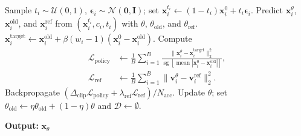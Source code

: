 \documentclass{article} %
\begin{document}
\begin{algorithm}[H]
\begin{algorithmic}[1]
                \State Sample $t_i\sim\mathcal{U}(0,1)$,
                $\boldsymbol{\epsilon}_i\sim\mathcal{N}(\mathbf{0},\mathbf{I})$;
                set $\mathbf{x}_i^{t_i}\leftarrow
                (1-t_i)\mathbf{x}_i^0+t_i\boldsymbol{\epsilon}_i$.
                \State Predict $\mathbf{x}_i^\theta$,
                $\mathbf{x}_i^{\mathrm{old}}$, and $\mathbf{x}_i^{\mathrm{ref}}$
                from $(\mathbf{x}_i^{t_i},c_i,t_i)$ with
                $\theta$, $\theta_{\mathrm{old}}$, and $\theta_{\mathrm{ref}}$.
                \State $\mathbf{x}_i^{\mathrm{target}}\leftarrow
                \mathbf{x}_i^{\mathrm{old}}+
                \beta(w_i-1)(\mathbf{x}_i^0-\mathbf{x}_i^{\mathrm{old}})$.
                \State Compute
                \[
                    \begin{aligned}
                    \mathcal{L}_{\mathrm{policy}}
                    &\leftarrow\frac{1}{B}\sum_{i=1}^{B}
                    \frac{\|\mathbf{x}_i^\theta-\mathbf{x}_i^{\mathrm{target}}\|_2^2}
                    {\operatorname{sg}[\operatorname{mean}
                    |\mathbf{x}_i^0-\mathbf{x}_i^{\mathrm{old}}|]},\\
                    \mathcal{L}_{\mathrm{ref}}
                    &\leftarrow\frac{1}{B}\sum_{i=1}^{B}
                    \|\mathbf{v}_i^\theta-\mathbf{v}_i^{\mathrm{ref}}\|_2^2.
                    \end{aligned}
                \]
                \State Backpropagate
                $(\Delta_{\mathrm{clip}}\mathcal{L}_{\mathrm{policy}}+
                \lambda_{\mathrm{ref}}\mathcal{L}_{\mathrm{ref}})/N_{\mathrm{acc}}$.
            \EndFor
            \State Update $\theta$; set
            $\theta_{\mathrm{old}}\leftarrow
            \eta\theta_{\mathrm{old}}+(1-\eta)\theta$ and
            $\mathcal{D}\leftarrow\emptyset$.
        \EndFor
    \end{algorithmic}
    \textbf{Output:} $\mathbf{x}_\theta$
\end{algorithm}
\end{document}
